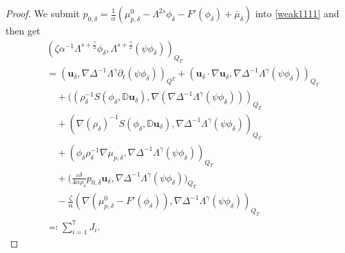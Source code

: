 \documentclass[10pt,a4paper]{amsart}
\begin{document}
\begin{proof}
				We  submit  $p_{0,\delta}=\frac{1}{\alpha}(\mu_{p,\delta}^{0}-\Lambda^{2s}\phi_{\delta}-F'(\phi_{\delta})+\bar{\mu}_{\delta})$ into \eqref{weak1111} and then get
				\begin{align}
					& (\zeta\alpha^{-1}\Lambda^{s+\frac{\gamma}{2}}\phi_{\delta},\Lambda^{s+\frac{\gamma}{2}}(\psi\phi_{\delta}))_{Q_{T}}
					\nonumber \\& =%
					(\mathbf{u}_{\delta},\nabla\Delta^{-1}\Lambda^{\gamma}\partial_t (\psi\phi_{\delta}))_{Q^{T}}
					+(\mathbf{u}_{\delta}\cdot\nabla
					\mathbf{u}_{\delta},\nabla\Delta^{-1}\Lambda^{\gamma}(\psi\phi_{\delta}))_{Q_{T}}
					\nonumber \\&\quad+((\rho_{\delta}^{-1}S(\phi_{\delta},\mathbb{ D}\mathbf{u}_{\delta}),\nabla(\nabla\Delta^{-1}\Lambda^{\gamma}(\psi\phi_{\delta})))_{Q_{T}}
					\nonumber \\&\quad+(\nabla(\rho_{\delta})^{-1}S(\phi_{\delta},\mathbb{ D}\mathbf{u}_{\delta}),\nabla\Delta^{-1}\Lambda^{\gamma}(\psi\phi_{\delta}))_{Q_{T}}
					\nonumber\\&\quad +(\phi_{\delta}\rho_{\delta}^{-1} \nabla \mu_{p,\delta},\nabla\Delta^{-1}\Lambda^{\gamma}(\psi\phi_{\delta}))_{Q_{T}}
					\nonumber\\& \quad+\bigg(\frac{\varepsilon\delta}{4\alpha\rho_{\delta}}  p_{0,\delta} \mathbf{u}_{\delta},\nabla\Delta^{-1}\Lambda^{\gamma}(\psi\phi_{\delta})\bigg)_{Q_{T}}
					\nonumber \\&\quad-\frac{\zeta}{\alpha}(\nabla(\mu_{p,\delta}^{0}-F'(\phi_{\delta})),\nabla\Delta^{-1}\Lambda^{\gamma}(\psi\phi_{\delta}))_{Q_{T}}
					\nonumber \\&\eqqcolon\sum_{i=1}^{7}J_{i}.\label{lemh55-5}
				\end{align}
				
				
				

\end{proof}
\end{document}
